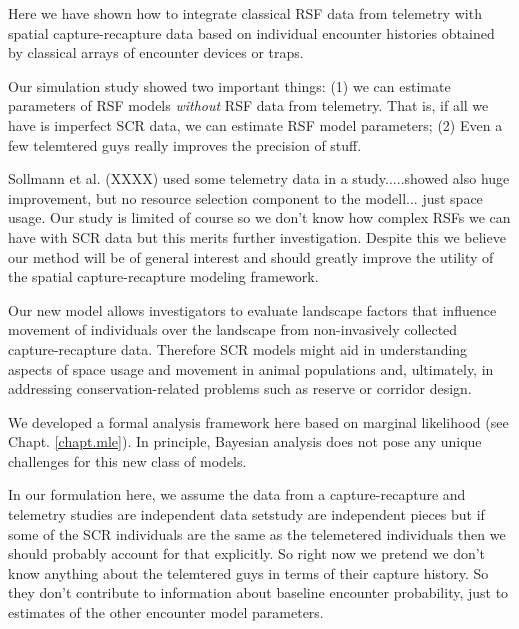 Here we have shown how to integrate classical RSF data from telemetry
with spatial capture-recapture data based on individual encounter
histories obtained by classical arrays of encounter devices or traps.

Our simulation study showed two important things:
(1) we can estimate parameters of RSF models {\it without} RSF data
from telemetry. That is, if all we have is imperfect SCR data, we can
estimate RSF model parameters;
(2) Even a few telemtered guys really
improves the precision of stuff.

Sollmann et al. (XXXX) used some telemetry data in a study.....showed
also huge improvement, but no resource selection component to the
modell... just space usage.
Our study is limited of course so we don't know how complex RSFs we
can have with SCR data but this merits further investigation. Despite
this we believe our method will be of general interest and should
greatly improve the utility of the spatial capture-recapture modeling
framework.


Our new model allows investigators to evaluate landscape factors that
influence movement of individuals over the landscape from
non-invasively collected capture-recapture data.  Therefore SCR models
might aid in understanding aspects of space usage and movement in
animal populations and, ultimately, in addressing conservation-related
problems such as reserve or corridor design.

We developed a formal analysis framework here based on 
marginal likelihood \citep{borchers_efford:2008}
(see Chapt. \ref{chapt.mle}).
In principle,
Bayesian analysis does not pose any unique challenges for this new
class of models.

In our formulation here, 
we assume the data from a capture-recapture and telemetry studies are
independent data setstudy 
are independent pieces but if some of the SCR
individuals are the same as the telemetered individuals then we should
probably account for that explicitly. So right now we pretend we don't
know anything about the telemtered guys in terms of their capture
history. So they don't contribute to information about baseline
encounter probability, just to estimates of the other encounter model
parameters. 

























